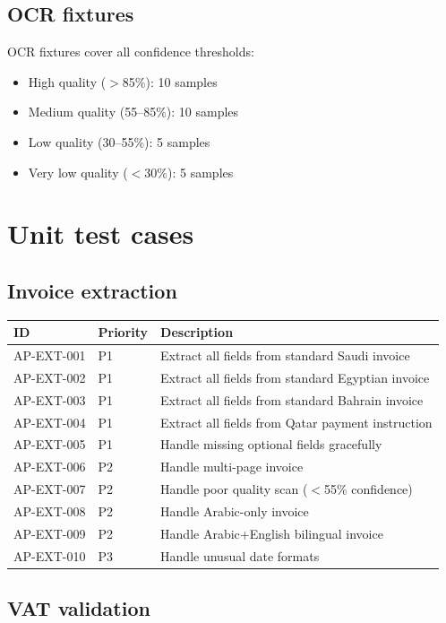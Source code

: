 \documentclass[11pt,a4paper,twoside]{report}
\begin{document}
\subsection{OCR fixtures}

OCR fixtures cover all confidence thresholds:
\begin{itemize}
\item High quality ($>$85\%): 10 samples
\item Medium quality (55--85\%): 10 samples
\item Low quality (30--55\%): 5 samples
\item Very low quality ($<$30\%): 5 samples
\end{itemize}

\section{Unit test cases}

\subsection{Invoice extraction}

\begin{tabularx}{\linewidth}{@{}l l X@{}}
\toprule
\textbf{ID} & \textbf{Priority} & \textbf{Description} \\ \midrule
AP-EXT-001 & P1 & Extract all fields from standard Saudi invoice \\
AP-EXT-002 & P1 & Extract all fields from standard Egyptian invoice \\
AP-EXT-003 & P1 & Extract all fields from standard Bahrain invoice \\
AP-EXT-004 & P1 & Extract all fields from Qatar payment instruction \\
AP-EXT-005 & P1 & Handle missing optional fields gracefully \\
AP-EXT-006 & P2 & Handle multi-page invoice \\
AP-EXT-007 & P2 & Handle poor quality scan ($<$55\% confidence) \\
AP-EXT-008 & P2 & Handle Arabic-only invoice \\
AP-EXT-009 & P2 & Handle Arabic+English bilingual invoice \\
AP-EXT-010 & P3 & Handle unusual date formats \\
\bottomrule
\end{tabularx}

\subsection{VAT validation}
\end{document}

